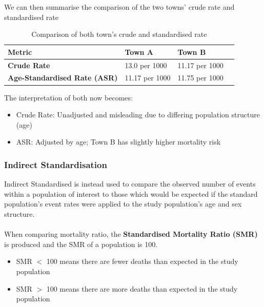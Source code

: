 \documentclass{article}
\begin{document}
We can then summarise the comparison of the two towns' crude rate and standardised rate
\begin{table}[H]
\centering
\begin{tabular}{|l|l|l|l|}
\hline
\textbf{Metric                     } & \textbf{Town A}         & \textbf{Town B}         \\ \hline
\textbf{Crude Rate                 } & 13.0 per 1000  & 11.17 per 1000 \\ \hline
\textbf{Age-Standardised Rate (ASR)} & 11.17 per 1000 & 11.75 per 1000 \\ \hline
\end{tabular}
\caption{Comparison of both town's crude and standardised rate}
\label{tab:comparison-metric}
\end{table}

The interpretation of both now becomes:
\begin{itemize}
    \item Crude Rate: Unadjusted and misleading due to differing population structure (age)
    \item ASR: Adjusted by age; Town B has slightly higher mortality risk
\end{itemize}

\subsubsection{Indirect Standardisation}
Indirect Standardised is instead used to compare the observed number of events within a population
of interest to those which would be expected if the standard population's event rates were applied
to the study population's age and sex structure.
\\~\\
When comparing mortality ratio, the \textbf{ Standardised Mortality Ratio (SMR) } is produced and the
SMR of a population is 100.
\begin{itemize}
    \item SMR $<$ 100 means there are fewer deaths than expected in the study population
    \item SMR $>$ 100 means there are more deaths than expected in the study population
\end{itemize}
\end{document}
